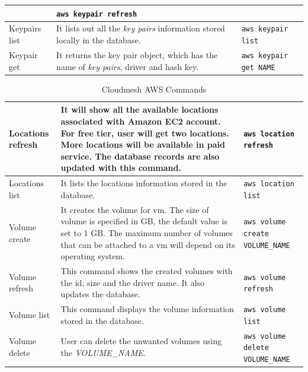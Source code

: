 \documentclass[9pt,twocolumn,twoside]{../../styles/osajnl}
\begin{document}
\begin{table}[p]
\begin{center}
\begin{tabular}{p{2cm}p{10cm}p{5cm}}
                         & \verb+aws keypair refresh+ \\
  \hline
  Keypairs list & It lists out all the \textit{key pairs} information stored locally in the database.
                         & \verb+aws keypair list+ \\
  \hline
  Keypair get & It returns the key pair object, which has the name of \textit{key pairs}, driver and hash key.
                         & \verb+aws keypair get NAME+ \\
  \hline
\end{tabular}
\end{center}
\end{table}


\begin{table}[htb]
\caption{Cloudmesh AWS Commands}\label{T:aws-commands} 
\begin{center}
\begin{tabular}{p{2cm}p{10cm}p{5cm}}
  Locations refresh & It will show all the available locations associated with Amazon EC2 account. For free tier, user will get two locations. More locations will be available in paid service. The database records are also updated with this command.
                         & \verb+aws location refresh+ \\
  \hline
  Locations list & It lists the locations information stored in the database.
                         & \verb+aws location list+ \\
  \hline
  Volume create & It creates the volume for vm. The size of volume is specified in GB, the default value is set to 1 GB. The maximum number of volumes that can be attached to a vm will depend on its operating system.
                         & \verb+aws volume create VOLUME_NAME+ \\
  \hline
  Volume refresh & This command shows the created volumes with the id, size and the driver name. It also updates the database.
                         & \verb+aws volume refresh+ \\
  \hline
  Volume list & This command displays the volume information stored in the database.
                         & \verb+aws volume list+ \\
  \hline
  Volume delete & User can delete the unwanted volumes using the \textit{VOLUME\_NAME}.
                         & \verb+aws volume delete VOLUME_NAME+ \\
\end{tabular}
\end{center}
\end{table}
\end{document}
